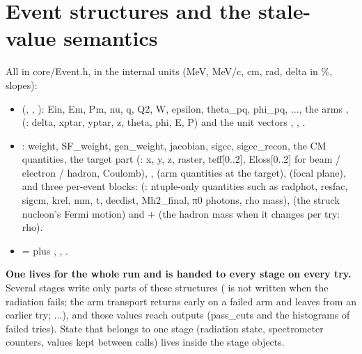 \section{\texorpdfstring{Event structures and the stale-value semantics}{Event structures and the stale-value semantics}}\label{developer_manual-03u5farchitecture:34-event-structures-and-the-stale-value-semantics}
All in core/\allowbreak{}Event.\allowbreak{}h,\allowbreak{} in the internal units (MeV, MeV/c, cm, rad, delta in \%, slopes):

\begin{itemize}
\item {} (, , ): Ein, Em, Pm, nu, q, Q2, W, epsilon, theta\_pq, phi\_pq, ..., the arms , 
(: delta, xptar, yptar, z, theta, phi, E, P) and the unit vectors , , .
\item {}: weight, SF\_weight, gen\_\allowbreak{}weight,\allowbreak{} jacobian, sigcc, sigcc\_\allowbreak{}recon,\allowbreak{} the CM quantities, the target part
(: x, y, z, raster, teff[0..2], Eloss[0..2] for beam / electron / hadron, Coulomb), ,  (arm
quantities at the target),  (focal plane), and three per-event blocks:  (: ntuple-only quantities
such as radphot, resfac, sigcm, krel, mm, t, decdist, Mh2\_final, π0 photons, rho mass),  (the struck
nucleon's Fermi motion) and  +  (the hadron mass when it changes per try: rho).
\item {} =  plus , , .
\end{itemize}
\textbf{One  lives for the whole run and is handed to every stage on every try.} Several stages write only parts
of these structures ( is not written when the radiation fails; the arm transport returns early on a failed arm and
leaves  from an earlier try; ...), and those values reach outputs (pass\_cuts and the histograms of
failed tries). State that belongs to one stage (radiation state, spectrometer counters, values kept between calls)
lives inside the stage objects.

